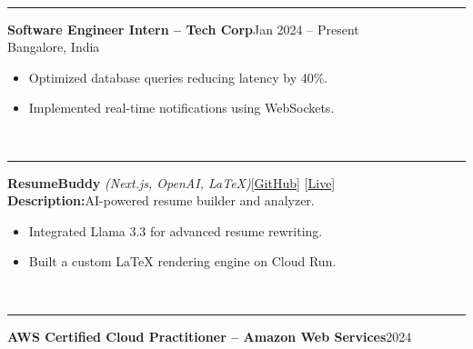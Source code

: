 \documentclass[letterpaper,11pt]{article}
\begin{document}
\par
{}\\
\vspace{2pt}\hrule\vspace{4pt}
\textbf{Software Engineer Intern -- Tech Corp}\hfill Jan 2024 -- Present\\
\small Bangalore, India\normalsize\\
\begin{itemize}
  \item Optimized database queries reducing latency by 40\%.
  \item Implemented real-time notifications using WebSockets.
\end{itemize}
\par\vspace{3pt}
\par\vspace{6pt}
\par
{}\\
\vspace{2pt}\hrule\vspace{4pt}
\textbf{ResumeBuddy} \textit{(Next.js, OpenAI, LaTeX)}\hfill {\color{cyan}[\href{\detokenize{https://github.com/rajeevkavala/resume-buddy}}{GitHub}]} {\color{cyan}[\href{\detokenize{https://resumebuddy.ai}}{Live}]}\\
\textbf{Description:}\quad AI-powered resume builder and analyzer.\\
\begin{itemize}
  \item Integrated Llama 3.3 for advanced resume rewriting.
  \item Built a custom LaTeX rendering engine on Cloud Run.
\end{itemize}
\par\vspace{3pt}
\par\vspace{6pt}
\par
{}\\
\vspace{2pt}\hrule\vspace{4pt}
\textbf{AWS Certified Cloud Practitioner -- Amazon Web Services}\hfill 2024\\
\par\vspace{2pt}
\par\vspace{6pt}
\end{document}
